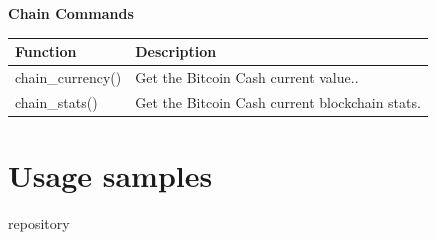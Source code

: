 \medskip 
\textbf{Chain Commands}
\begin{table}[!ht]
    \centering
    \begin{tabular}{||p{6.2cm}|p{6cm}||}
    \hline
    \textbf{Function}                          & \textbf{Description}                                                  \\ \hline
    chain\_currency()                           & Get the Bitcoin Cash current value..                          \\ \hline
    chain\_stats()                              & Get the Bitcoin Cash current blockchain stats\footnotemark[3].              \\ \hline
   \end{tabular}
    \end{table}


\section{Usage samples}
\label{sec:sample}
repository